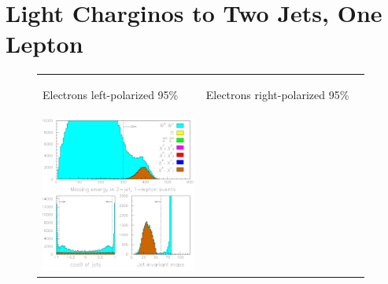 \documentclass[12pt]{article}
\begin{document}
\section{Light Charginos to Two Jets, One Lepton}

\begin{figure}[t]
  \begin{center}
    \begin{tabular}{p{0.49\linewidth} p{0.49\linewidth}}
      \begin{minipage}{\linewidth} \begin{center} Electrons left-polarized 95\% \end{center} \end{minipage} &
      \begin{minipage}{\linewidth} \begin{center} Electrons right-polarized 95\% \end{center} \end{minipage} \\
      \begin{minipage}{\linewidth} \includegraphics[width=\linewidth]{jimpcharginocuts_a} \end{minipage} &

\end{tabular}
\end{center}
\end{figure}
\end{document}

